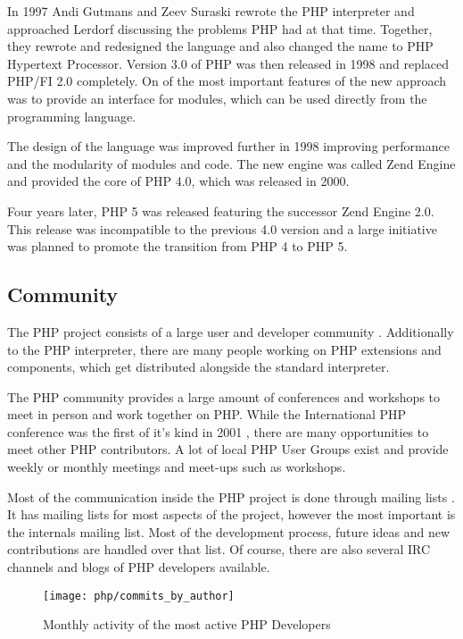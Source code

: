 In 1997 Andi Gutmans and Zeev Suraski rewrote the PHP interpreter and
approached Lerdorf discussing the problems PHP had at that time. Together, they
rewrote and redesigned the language and also changed the name to PHP Hypertext
Processor. Version 3.0 of PHP was then released in 1998 and replaced PHP/FI 2.0
completely. On of the most important features of the new approach was to
provide an interface for modules, which can be used directly from the
programming language.

The design of the language was improved further in 1998 improving performance
and the modularity of modules and code. The new engine was called Zend Engine
and provided the core of PHP 4.0, which was released in 2000.

Four years later, PHP 5 was released featuring the successor Zend Engine 2.0.
This release was incompatible to the previous 4.0 version and a large
initiative was planned to promote the transition from PHP 4 to PHP 5.


\subsection{Community} %
\label{sub:Community}

The PHP project consists of a large user and developer community
\cite{Magnusson2010}. Additionally to the PHP interpreter, there are many
people working on PHP extensions and components, which get distributed
alongside the standard interpreter.

The PHP community provides a large amount of conferences and workshops to meet
in person and work together on PHP. While the International PHP conference was
the first of it's kind in 2001 \cite{PHPConferences}, there are many
opportunities to meet other PHP contributors. A lot of local PHP User Groups
exist and provide weekly or monthly meetings and meet-ups such as workshops.

Most of the communication inside the PHP project is done through mailing lists
\cite{Magnusson2010}. It has mailing lists for most aspects of the project,
however the most important is the internals mailing list. Most of the
development process, future ideas and new contributions are handled over that
list. Of course, there are also several \ac{IRC} channels and blogs of PHP
developers available.

\begin{figure}[htbp]
  \centering
  \texttt{[image: php/commits\_by\_author]}
  \caption{Monthly activity of the most active PHP Developers}
\end{figure}

